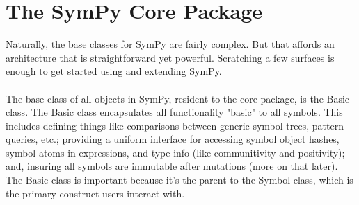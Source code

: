 \documentclass[11pt,a4paper,oneside]{report}
\begin{document}
\section*{The SymPy Core Package}
Naturally, the base classes for SymPy are fairly complex. But that affords an architecture that is straightforward yet powerful. Scratching a few surfaces is enough to get started using and extending SymPy.\\\\
The base class of all objects in SymPy, resident to the core package, is the Basic class. The Basic class encapsulates all functionality "basic" to all symbols. This includes defining things like comparisons between generic symbol trees, pattern queries, etc.; providing a uniform interface for accessing symbol object hashes, symbol atoms in expressions, and type info (like communitivity and positivity); and, insuring all symbols are immutable after mutations (more on that later). The Basic class is important because it's the parent to the Symbol class, which is the primary construct users interact with.
\end{document}
